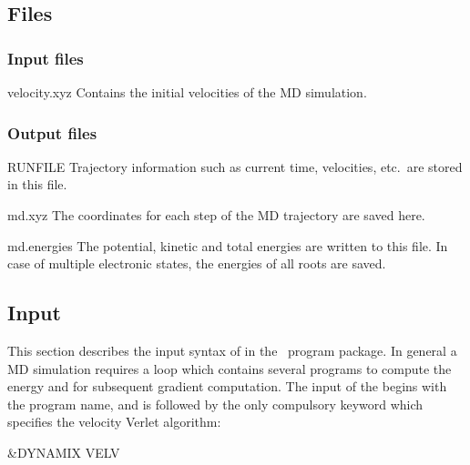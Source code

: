 \subsection{Files}
\label{UG:sec:dynamix_files}

\subsubsection{Input files}
\label{UG:sec:dynamix_inp_files}

\begin{filelist}
\item[velocity.xyz]
Contains the initial velocities of the MD simulation.
\end{filelist}

\subsubsection{Output files}
\label{UG:sec:dynamix_output_files}

\begin{filelist}
\item[RUNFILE]
Trajectory information such as current time, velocities, etc.\ are stored in this file.
\item[md.xyz]
The coordinates for each step of the MD trajectory are saved here.
\item[md.energies]
The potential, kinetic and total energies are written to this file. In case of multiple
electronic states, the energies of all roots are saved.
\end{filelist}

\subsection{Input}
\label{UG:sec:dynamix_inp}

This section describes the input syntax of  in the \molcas\ program
package. In general a MD simulation requires a  loop which contains
several programs to compute the energy and  for subsequent gradient
computation. The input of the  begins with the program name,
and is followed by the only compulsory keyword  which specifies the
velocity Verlet algorithm:
\begin{inputlisting}
&DYNAMIX
 VELV
\end{inputlisting}

